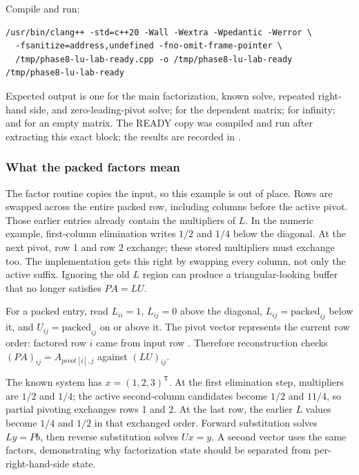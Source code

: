 Compile and run:

\begin{verbatim}
/usr/bin/clang++ -std=c++20 -Wall -Wextra -Wpedantic -Werror \
  -fsanitize=address,undefined -fno-omit-frame-pointer \
  /tmp/phase8-lu-lab-ready.cpp -o /tmp/phase8-lu-lab-ready
/tmp/phase8-lu-lab-ready
\end{verbatim}

Expected output is one  for the main factorization, known solve, repeated right-hand side, and zero-leading-pivot solve;  for the dependent matrix;  for infinity; and  for an empty matrix. The READY copy was compiled and run after extracting this exact block; the results are recorded in .

\subsubsection{What the packed factors mean}\label{01-foundations-i-ch019-what-the-packed-factors-mean}

\hypertarget{01-foundations-i-ch019-what-the-packed-factors-mean}{}

The factor routine copies the input, so this example is out of place. Rows are swapped across the entire packed row, including columns before the active pivot. Those earlier entries already contain the multipliers of \(L\). In the numeric example, first-column elimination writes \(1/2\) and \(1/4\) below the diagonal. At the next pivot, row 1 and row 2 exchange; these stored multipliers must exchange too. The implementation gets this right by swapping every column, not only the active suffix. Ignoring the old \(L\) region can produce a triangular-looking buffer that no longer satisfies \(PA=LU\).

For a packed entry, read \(L_{ii}=1\), \(L_{ij}=0\) above the diagonal, \(L_{ij}=\text{packed}_{ij}\) below it, and \(U_{ij}=\text{packed}_{ij}\) on or above it. The pivot vector represents the current row order: factored row \(i\) came from input row \BookInlineCode{pivot{[}i{]}}. Therefore reconstruction checks \((PA)_{ij}=A_{pivot[i],j}\) against \((LU)_{ij}\).

The known system has \(x=(1,2,3)^\mathsf T\). At the first elimination step, multipliers are \(1/2\) and \(1/4\); the active second-column candidates become \(1/2\) and \(11/4\), so partial pivoting exchanges rows 1 and 2. At the last row, the earlier \(L\) values become \(1/4\) and \(1/2\) in that exchanged order. Forward substitution solves \(Ly=Pb\), then reverse substitution solves \(Ux=y\). A second vector uses the same factors, demonstrating why factorization state should be separated from per-right-hand-side state.

